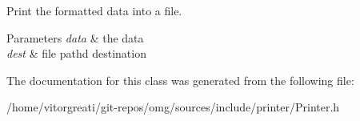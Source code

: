 Print the formatted data into a file. 


\begin{DoxyParams}{Parameters}
{\em data} & the data \\
\hline
{\em dest} & file pathd destination \\
\hline
\end{DoxyParams}


The documentation for this class was generated from the following file\+:\begin{DoxyCompactItemize}
\item 
/home/vitorgreati/git-\/repos/omg/sources/include/printer/Printer.\+h\end{DoxyCompactItemize}

